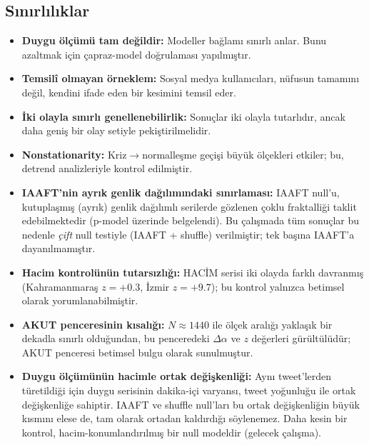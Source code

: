 \documentclass[11pt,a4paper]{article}
\begin{document}
\subsection{Sınırlılıklar}
\label{sec:sinirlilik}

\begin{itemize}[leftmargin=1.4em]
  \item \textbf{Duygu ölçümü tam değildir:} Modeller bağlamı sınırlı anlar.
        Bunu azaltmak için çapraz-model doğrulaması yapılmıştır.
  \item \textbf{Temsilî olmayan örneklem:} Sosyal medya kullanıcıları,
        nüfusun tamamını değil, kendini ifade eden bir kesimini temsil eder.
  \item \textbf{İki olayla sınırlı genellenebilirlik:} Sonuçlar iki olayla
        tutarlıdır, ancak daha geniş bir olay setiyle pekiştirilmelidir.
  \item \textbf{Nonstationarity:} Kriz$\to$normalleşme geçişi büyük ölçekleri
        etkiler; bu, detrend analizleriyle kontrol edilmiştir.
  \item \textbf{IAAFT'nin ayrık genlik dağılımındaki sınırlaması:} IAAFT
        null'u, kutuplaşmış (ayrık) genlik dağılımlı serilerde gözlenen
        çoklu fraktalliği taklit edebilmektedir (p-model üzerinde belgelendi).
        Bu çalışmada tüm sonuçlar bu nedenle \emph{çift} null testiyle
        (IAAFT + shuffle) verilmiştir; tek başına IAAFT'a dayanılmamıştır.
  \item \textbf{Hacim kontrolünün tutarsızlığı:} HACİM serisi iki olayda
        farklı davranmış (Kahramanmaraş $z=+0.3$, İzmir $z=+9.7$); bu
        kontrol yalnızca betimsel olarak yorumlanabilmiştir.
  \item \textbf{AKUT penceresinin kısalığı:} $N\approx 1440$ ile ölçek
        aralığı yaklaşık bir dekadla sınırlı olduğundan, bu penceredeki
        $\Delta\alpha$ ve $z$ değerleri gürültülüdür; AKUT penceresi
        betimsel bulgu olarak sunulmuştur.
  \item \textbf{Duygu ölçümünün hacimle ortak değişkenliği:} Aynı tweet'lerden
        türetildiği için duygu serisinin dakika-içi varyansı, tweet yoğunluğu
        ile ortak değişkenliğe sahiptir. IAAFT ve shuffle null'ları bu ortak
        değişkenliğin büyük kısmını elese de, tam olarak ortadan kaldırdığı
        söylenemez. Daha kesin bir kontrol, hacim-konumlandırılmış bir null
        modeldir (gelecek çalışma).
\end{itemize}
\end{document}
